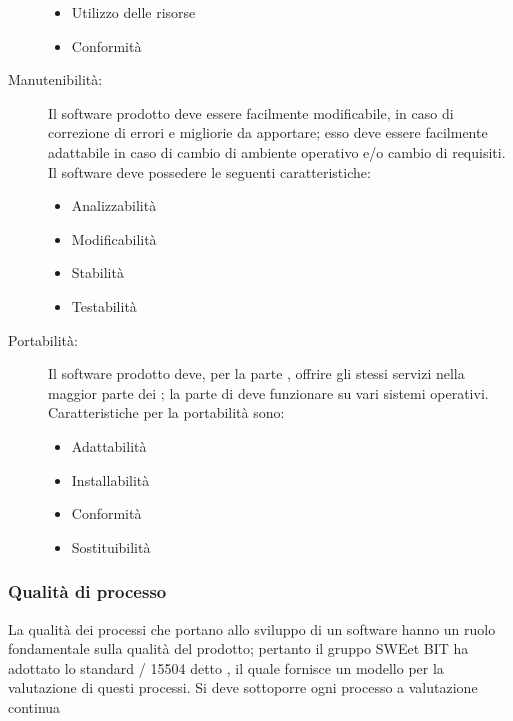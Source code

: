 \begin{description}
\begin{itemize}
        \item Utilizzo delle risorse
        \item Conformità
      \end{itemize}
      \item [Manutenibilità:] Il software prodotto deve essere facilmente modificabile, in caso di correzione di errori e migliorie da apportare; esso deve essere facilmente
      adattabile in caso di cambio di ambiente operativo e/o cambio di requisiti. Il software deve possedere le seguenti caratteristiche:
      \begin{itemize}
        \item Analizzabilità
        \item Modificabilità
        \item Stabilità
        \item Testabilità
      \end{itemize}
      \item [Portabilità:] Il software prodotto deve, per la parte , offrire gli stessi servizi nella maggior parte dei ;
      la parte di  deve funzionare su vari sistemi operativi. Caratteristiche per la portabilità sono:
      \begin{itemize}
        \item Adattabilità
        \item Installabilità
        \item Conformità
        \item Sostituibilità
      \end{itemize}

    \end{description}
    \subsubsection{Qualità di processo}
    La qualità dei processi che portano allo sviluppo di un software hanno un ruolo fondamentale sulla qualità del prodotto;
    pertanto il gruppo SWEet BIT ha adottato lo standard / 15504 detto ,
    il quale fornisce un modello per la valutazione di questi processi.
    Si deve sottoporre ogni processo a valutazione continua
